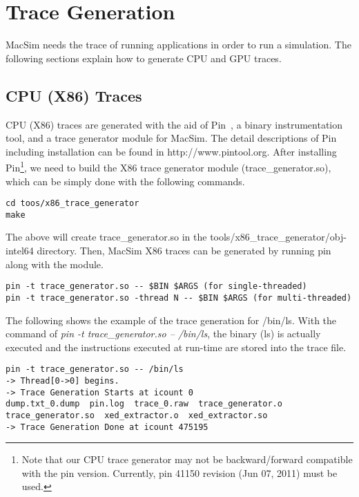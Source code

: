 
\clearpage
\section{Trace Generation}

MacSim needs the trace of running applications in order to run a simulation.
The following sections explain how to generate CPU and GPU traces.

\subsection{CPU (X86) Traces}

CPU (X86) traces are generated with the aid of Pin~\cite{pin}, a binary instrumentation 
tool, and a trace generator module for MacSim.  The detail descriptions of Pin
including installation can be found in http://www.pintool.org.  After
installing Pin\footnote{Note that our CPU trace generator may not be
backward/forward compatible with the pin version. Currently, pin 41150
revision (Jun 07, 2011) must be used.}, we need to build the X86 trace
generator module (trace\_generator.so), which can be simply done with the following commands.

\smallskip
\begin{lstlisting}
cd toos/x86_trace_generator
make
\end{lstlisting}
\smallskip

The above will create trace\_generator.so in the tools/x86\_trace\_generator/obj-intel64 directory. 
Then, MacSim X86 traces can be generated by running pin along with the module. 

\smallskip
\begin{lstlisting}
pin -t trace_generator.so -- $BIN $ARGS (for single-threaded)
pin -t trace_generator.so -thread N -- $BIN $ARGS (for multi-threaded)
\end{lstlisting}
\smallskip

The following shows the example of the trace generation for /bin/ls. 
With the command of \emph{pin -t trace\_generator.so -- /bin/ls}, the binary (ls) is 
actually executed and the instructions executed at run-time are stored into the trace file.

\smallskip
\begin{lstlisting}
pin -t trace_generator.so -- /bin/ls
-> Thread[0->0] begins.
-> Trace Generation Starts at icount 0
dump.txt_0.dump  pin.log  trace_0.raw  trace_generator.o  trace_generator.so  xed_extractor.o  xed_extractor.so
-> Trace Generation Done at icount 475195
\end{lstlisting}
\smallskip

